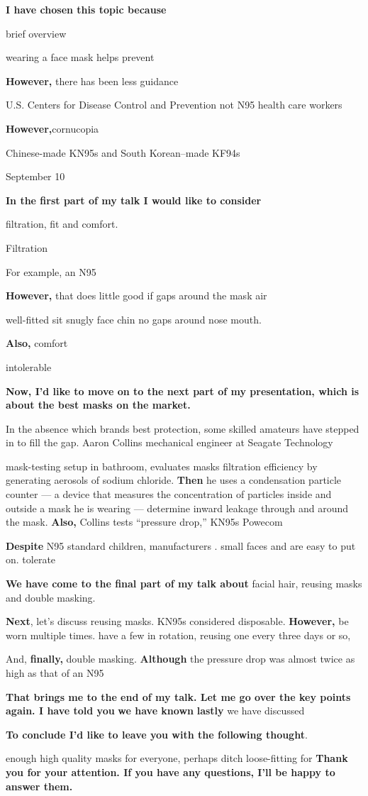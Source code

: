 \documentclass[a4paper, 12pt]{extarticle}
\renewcommand{\emph}{\textbf}
\begin{document}
 \textbf{ I have chosen this topic because}


brief overview 


wearing a face mask helps prevent 

\emph{However,} there has been less guidance 

U.S. Centers for Disease Control and Prevention  
not  N95  
health care workers 

\emph{However,}cornucopia

Chinese-made KN95s and South Korean–made KF94s

September 10


\emph{In the first part of my talk I would like to consider} 

filtration, fit and comfort. 

Filtration 

For example, an N95 

\emph{However,} that does little good if 
gaps around the mask air 

well-fitted sit snugly  face  chin no gaps around  nose mouth. 

\emph{Also,} comfort 

intolerable

\emph{Now, I’d like to move on to the next part of my presentation, which is about the best masks on the market.}

In the absence which brands  best protection, some skilled amateurs have  stepped in to fill the gap. Aaron Collins mechanical engineer at Seagate Technology

mask-testing setup in bathroom, evaluates masks filtration efficiency by generating aerosols of sodium chloride. \emph{Then} he uses a condensation particle counter --- a device that measures the concentration of particles inside and outside a mask he is wearing --- determine inward leakage through and around the mask. \emph{Also,} Collins tests “pressure drop,”   KN95s  Powecom 

\emph{Despite} N95 standard children, manufacturers . small faces and are easy to put on.  tolerate


\emph{We have come to the final part of my talk about} facial hair, reusing masks and double masking.


\emph{Next}, let's discuss reusing masks. KN95s  considered disposable. \emph{However,} be worn multiple times.
have a few in rotation, reusing one every three days or so, 

And, \emph{finally,} double masking. \emph{Although} the pressure drop was almost twice as high as that of an N95 

\emph{That brings me to the end of my talk. Let me go over the key points again. I have told you} \emph{we have known} \emph{ lastly} we have
discussed 

\emph{To conclude I’d like to leave you with the following thought}.

enough high quality masks for everyone, perhaps  ditch loose-fitting for \emph{Thank you for your attention. If you have any questions, I’ll be happy to answer them. }
\end{document}
